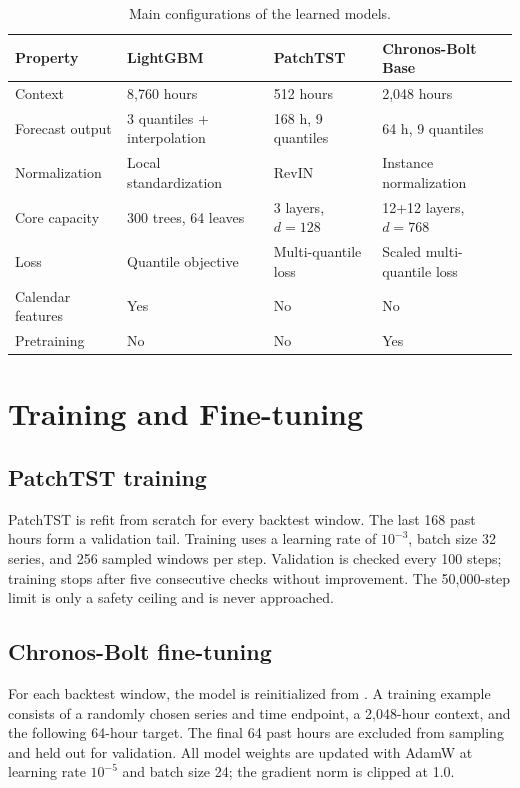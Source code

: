 \documentclass[11pt,a4paper]{article}
\newcommand{\code}[1]{\texttt{\detokenize{#1}}}
\begin{document}
\begin{table}[htbp]
\centering
\caption{Main configurations of the learned models.}
\label{tab:architectures}
\small
\begin{tabularx}{\textwidth}{@{}lYYY@{}}
\toprule
Property & LightGBM & PatchTST & Chronos-Bolt Base\\
\midrule
Context & 8,760 hours & 512 hours & 2,048 hours\\
Forecast output & 3 quantiles + interpolation & 168 h, 9 quantiles & 64 h, 9 quantiles\\
Normalization & Local standardization & RevIN & Instance normalization\\
Core capacity & 300 trees, 64 leaves & 3 layers, $d=128$ & 12+12 layers, $d=768$\\
Loss & Quantile objective & Multi-quantile loss & Scaled multi-quantile loss\\
Calendar features & Yes & No & No\\
Pretraining & No & No & Yes\\
\bottomrule
\end{tabularx}
\end{table}

\section{Training and Fine-tuning}

\subsection{PatchTST training}

PatchTST is refit from scratch for every backtest window. The last 168 past hours form a validation
tail. Training uses a learning rate of $10^{-3}$, batch size 32 series, and 256 sampled windows per
step. Validation is checked every 100 steps; training stops after five consecutive checks without
improvement. The 50,000-step limit is only a safety ceiling and is never approached.

\subsection{Chronos-Bolt fine-tuning}

For each backtest window, the model is reinitialized from \code{amazon/chronos-bolt-base}. A
training example consists of a randomly chosen series and time endpoint, a 2,048-hour context, and
the following 64-hour target. The final 64 past hours are excluded from sampling and held out for
validation. All model weights are updated with AdamW at learning rate $10^{-5}$ and batch size 24;
the gradient norm is clipped at 1.0.
\end{document}

